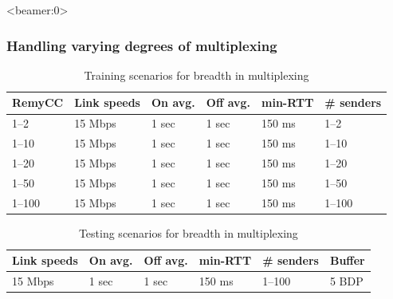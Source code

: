 \begin{frame}<beamer:0>
\frametitle{Handling varying degrees of multiplexing}
\begin{table}
\begin{center}
\begin{scriptsize}
\begin{tabular}{l|l|l|l|l|l}
\bf RemyCC & \bf Link speeds & \bf On avg. & \bf Off avg. & \bf min-RTT &
\bf \# senders \\
\hline
1--2     & 15 Mbps & 1 sec & 1 sec & 150 ms & 1--2 \\
1--10    & 15 Mbps & 1 sec & 1 sec & 150 ms & 1--10 \\
1--20    & 15 Mbps & 1 sec & 1 sec & 150 ms & 1--20 \\
1--50    & 15 Mbps & 1 sec & 1 sec & 150 ms & 1--50 \\
1--100   & 15 Mbps & 1 sec & 1 sec & 150 ms & 1--100 \\
\end{tabular}
\end{scriptsize}
\caption{Training scenarios for breadth in multiplexing}
\label{table:multiplexing}
\end{center}
\end{table}

\begin{table}
\begin{center}
\begin{scriptsize}
\begin{tabular}{l|l|l|l|l|l}
\bf Link speeds & \bf On avg. & \bf Off avg. & \bf min-RTT &
\bf \# senders & Buffer \\
\hline
15 Mbps & 1 sec & 1 sec & 150 ms & 1--100 & 5 BDP\\
\end{tabular}
\end{scriptsize}
\caption{Testing scenarios for breadth in multiplexing}
\label{table:muxtesting}
\end{center}
\end{table}

\end{frame}

